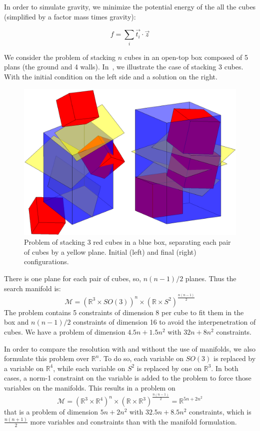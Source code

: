 In order to simulate gravity, we minimize the potential energy of the all the cubes (simplified by a factor mass times gravity):

\begin{equation}
  f = \sum\limits_i \vec{t_i}\cdot \vec{z}
\end{equation}

We consider the problem of stacking $n$ cubes in an open-top box composed of 5 plans (the ground and 4 walls).
In~, we illustrate the case of stacking 3 cubes.
With the initial condition on the left side and a solution on the right.
\begin{figure}
\centering
  \includegraphics[width=.8\linewidth]{3cubes.png}
  \caption{Problem of stacking 3 red cubes in a blue box, separating each pair of cubes by a yellow plane. Initial (left) and final (right) configurations.}
\label{fig:cubes}
\end{figure}

There is one plane for each pair of cubes, so, $n(n-1)/2$ planes.
Thus the search manifold is:
\begin{equation}
  \mathcal{M} = {\left( \mathbb{R}^3\times SO(3) \right)}^n \times {\left( \mathbb{R} \times S^2 \right)}^{\frac{n(n-1)}{2}} \nonumber
\end{equation}
The problem contains 5 constraints of dimension 8 per cube to fit them in the box and $n(n-1)/2$ constraints of dimension 16 to avoid the interpenetration of cubes.
We have a problem of dimension $4.5n+1.5n^2$ with $32n+8n^2$ constraints.

In order to compare the resolution with and without the use of manifolds, we also formulate this problem over $\mathbb{R}^n$.
To do so, each variable on $SO(3)$ is replaced by a variable on $\mathbb{R}^4$, while each variable on $S^2$ is replaced by one on $\mathbb{R}^3$.
In both cases, a norm-1 constraint on the variable is added to the problem to force those variables on the manifolds.
This results in a problem on
\begin{equation}
  \mathcal{M}={\left( \mathbb{R}^3\times \mathbb{R}^4 \right)}^n \times {\left( \mathbb{R} \times \mathbb{R}^3 \right)}^{\frac{n(n-1)}{2}} = \mathbb{R}^{5n+2n^2} \nonumber
\end{equation}
that is a problem of dimension $5n+2n^2$ with $32.5n+8.5n^2$ constraints, which is $\frac{n(n+1)}{2}$ more variables and constraints than with the manifold formulation.


